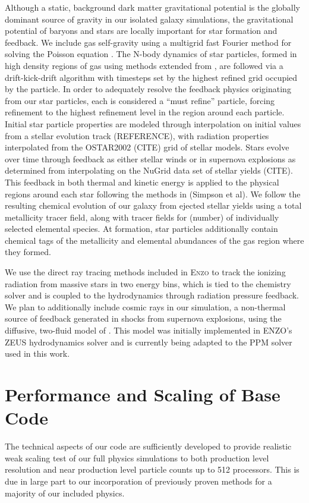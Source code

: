 \documentclass[11pt]{article}
\begin{document}
Although a static, background dark matter gravitational potential is the globally dominant source of gravity in our isolated galaxy simulations, the gravitational potential of baryons and stars are locally important for star formation and feedback. We include gas self-gravity using a multigrid fast Fourier method for solving the Poisson equation . The N-body dynamics of star particles, formed in high density regions of gas using methods extended from \cite{Goldbaum}, are followed via a drift-kick-drift algorithm \citep{HickneyEastwood1988} with timesteps set by the highest refined grid occupied by the particle. In order to adequately resolve the feedback physics originating from our star particles, each is considered a ``must refine'' particle, forcing refinement to the highest refinement level in the region around each particle. Initial star particle properties are modeled through interpolation on initial values from a stellar evolution track (REFERENCE), with radiation properties interpolated from the OSTAR2002 (CITE) grid of stellar models. Stars evolve over time through feedback as either stellar winds or in supernova explosions as determined from interpolating on the NuGrid data set of stellar yields (CITE). This feedback in both thermal and kinetic energy is applied to the physical regions around each star following the methods in (Simpson et al). We follow the resulting chemical evolution of our galaxy from ejected stellar yields using a total metallicity tracer field, along with tracer fields for (number) of individually selected elemental species. At formation, star particles additionally contain chemical tags of the metallicity and elemental abundances of the gas region where they formed.

We use the direct ray tracing methods included in \textsc{Enzo} to track the ionizing radiation from massive stars in two energy bins, which is tied to the chemistry solver and is coupled to the hydrodynamics through radiation pressure feedback. We plan to additionally include cosmic rays in our simulation, a non-thermal source of feedback generated in shocks from supernova explosions, using the diffusive, two-fluid model of \cite{Salem}. This model was initially implemented in \textsc{ENZO}'s ZEUS hydrodynamics solver and is currently being adapted to the PPM solver used in this work. 

\section{Performance and Scaling of Base Code}

The technical aspects of our code are sufficiently developed to provide realistic weak scaling test of our full physics simulations to both production level resolution and near production level particle counts up to 512 processors. This is due in large part to our incorporation of previously proven methods for a majority of our included physics. 



\end{document}

